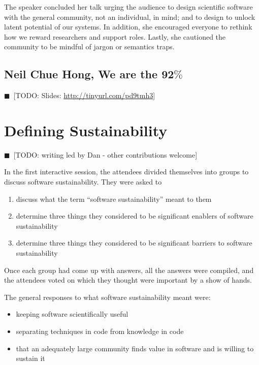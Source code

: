 \documentclass[11pt, oneside]{amsart}
\newcommand{\todo}[1]{{\color{blue}$\blacksquare$~\textsf{[TODO: #1]}}}
\begin{document}
The speaker concluded her talk urging the audience to design scientific software
with the general community, not an individual, in mind; and to design to unlock
latent potential of our systems. In addition, she encouraged everyone to rethink
how we reward researchers and support roles. Lastly, she cautioned the community
to be mindful of jargon or semantics traps.


\subsection{Neil Chue Hong, We are the 92$\%$} 
\label{keynote2}

\todo{Slides: \url{http://tinyurl.com/pd9tmh3}}

\section{Defining Sustainability} \label{sec:defining}

\todo{writing led by Dan - other contributions welcome}

In the first interactive session, the attendees divided themselves into groups
to discuss software sustainability. They were asked to
\begin{enumerate}
\item discuss what the term ``software sustainability'' meant to them

\item determine three things they considered to be significant enablers of
software sustainability

\item determine three things they considered to be significant barriers to
software sustainability
\end{enumerate}
Once each group had come up with answers, all the answers were compiled, and the
attendees voted on which they thought were important by a show of hands.

The general responses to what software sustainability meant were:
\begin{itemize}
\item keeping software scientifically useful
\item separating techniques in code from knowledge in code
\item that an adequately large community finds value in software and is willing
to sustain it
\end{itemize}
\end{document}
